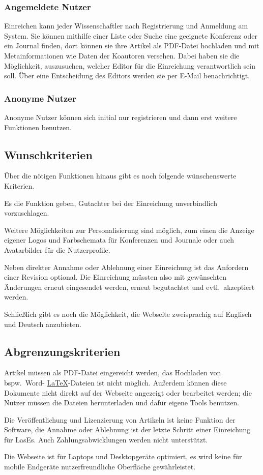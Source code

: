 \subsubsection{Angemeldete Nutzer}
Einreichen kann jeder Wissenschaftler nach Registrierung und Anmeldung am System.
Sie können mithilfe einer Liste oder Suche eine geeignete Konferenz oder ein Journal finden,
dort können sie ihre Artikel als PDF-Datei hochladen und mit Metainformationen wie Daten der Koautoren versehen.
Dabei haben sie die Möglichkeit, auszusuchen, welcher Editor für die Einreichung verantwortlich sein soll.
Über eine Entscheidung des Editors werden sie per E-Mail benachrichtigt.

\subsubsection{Anonyme Nutzer}
Anonyme Nutzer können sich initial nur registrieren und dann erst weitere Funktionen benutzen.


\subsection{Wunschkriterien}

Über die nötigen Funktionen hinaus gibt es noch folgende wünschenswerte Kriterien.

Es die Funktion geben, Gutachter bei der Einreichung unverbindlich vorzuschlagen.

Weitere Möglichkeiten zur Personalisierung sind möglich,
zum einen die Anzeige eigener Logos und Farbschemata für Konferenzen und Journale oder auch Avatarbilder für die Nutzerprofile.

Neben direkter Annahme oder Ablehnung einer Einreichung ist das Anfordern einer Revision optional.
Die Einreichung müssten also mit gewünschten Änderungen erneut eingesendet werden, erneut begutachtet und evtl.\ akzeptiert werden.

Schließlich gibt es noch die Möglichkeit, die Webseite zweisprachig auf Englisch und Deutsch anzubieten.

\subsection{Abgrenzungskriterien}

Artikel müssen als PDF-Datei eingereicht werden, das Hochladen von bspw.\ Word- \hyperref[glo:latex]{\LaTeX}-Dateien ist nicht möglich.
Außerdem können diese Dokumente nicht direkt auf der Webseite angezeigt oder bearbeitet werden;
die Nutzer müssen die Dateien herunterladen und dafür eigene Tools benutzen.

Die Veröffentlichung und Lizenzierung von Artikeln ist keine Funktion der Software,
die Annahme oder Ablehnung ist der letzte Schritt einer Einreichung für LasEs.
Auch Zahlungsabwicklungen werden nicht unterstützt.

Die Webseite ist für Laptops und Desktopgeräte optimiert, es wird keine für mobile Endgeräte nutzerfreundliche Oberfläche gewährleistet.
